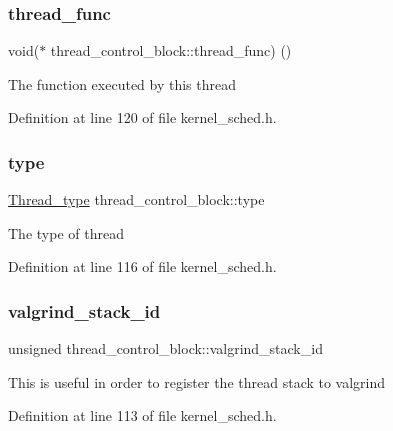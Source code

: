 \subsubsection{\texorpdfstring{thread\+\_\+func}{thread\_func}}
{\footnotesize\ttfamily void($\ast$ thread\+\_\+control\+\_\+block\+::thread\+\_\+func) ()}

The function executed by this thread 

Definition at line 120 of file kernel\+\_\+sched.\+h.

\mbox{\label{structthread__control__block_abd0f40bdcb22c701df03f560bbc42d5c}} 
\subsubsection{\texorpdfstring{type}{type}}
{\footnotesize\ttfamily \hyperlink{group__scheduler_ga18795bc1ab00161fc27ce34b1895fb03}{Thread\+\_\+type} thread\+\_\+control\+\_\+block\+::type}

The type of thread 

Definition at line 116 of file kernel\+\_\+sched.\+h.

\mbox{\label{structthread__control__block_ad8a2da36c0ad775c12c5f66f4fec9d41}} 
\subsubsection{\texorpdfstring{valgrind\+\_\+stack\+\_\+id}{valgrind\_stack\_id}}
{\footnotesize\ttfamily unsigned thread\+\_\+control\+\_\+block\+::valgrind\+\_\+stack\+\_\+id}

This is useful in order to register the thread stack to valgrind 

Definition at line 113 of file kernel\+\_\+sched.\+h.

\mbox{\label{structthread__control__block_a7dbf9ba7df67911abb7951e249f587b6}} 
